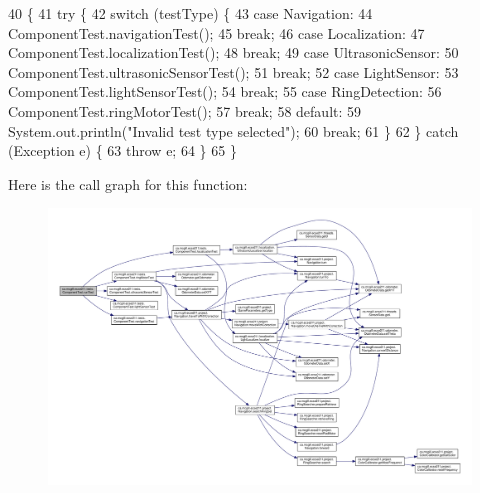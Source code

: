 \begin{DoxyCode}
40                                                              \{
41     \textcolor{keywordflow}{try} \{
42       \textcolor{keywordflow}{switch} (testType) \{
43         \textcolor{keywordflow}{case} Navigation:
44           ComponentTest.navigationTest();
45           \textcolor{keywordflow}{break};
46         \textcolor{keywordflow}{case} Localization:
47           ComponentTest.localizationTest();
48           \textcolor{keywordflow}{break};
49         \textcolor{keywordflow}{case} UltrasonicSensor:
50           ComponentTest.ultrasonicSensorTest();
51           \textcolor{keywordflow}{break};
52         \textcolor{keywordflow}{case} LightSensor:
53           ComponentTest.lightSensorTest();
54           \textcolor{keywordflow}{break};
55         \textcolor{keywordflow}{case} RingDetection:
56           ComponentTest.ringMotorTest();
57           \textcolor{keywordflow}{break};
58         \textcolor{keywordflow}{default}:
59           System.out.println(\textcolor{stringliteral}{"Invalid test type selected"});
60           \textcolor{keywordflow}{break};
61       \}
62     \} \textcolor{keywordflow}{catch} (Exception e) \{
63       \textcolor{keywordflow}{throw} e;
64     \}
65   \}
\end{DoxyCode}
Here is the call graph for this function\+:
\nopagebreak
\begin{figure}[H]
\begin{center}
\leavevmode
\includegraphics[width=350pt]{enumca_1_1mcgill_1_1ecse211_1_1tests_1_1_component_test_a5dc8bf97bc48adf5bee88d425a1a974e_cgraph}
\end{center}
\end{figure}
\mbox{\label{enumca_1_1mcgill_1_1ecse211_1_1tests_1_1_component_test_ae85caa20c6391bacc4fdbd411ee3f113}} 
